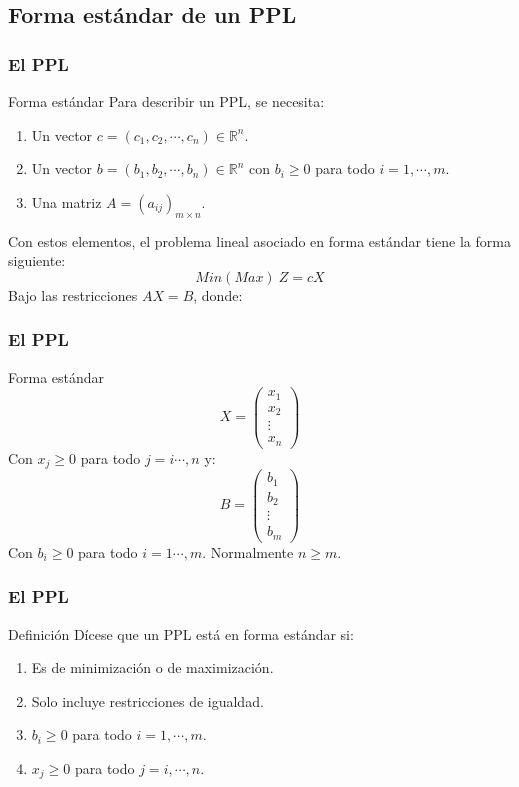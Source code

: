 \documentclass{beamer}
\begin{document}
\subsection{Forma est\'andar de un PPL}

\begin{frame}
\frametitle{El PPL}
\begin{block}{Forma est\'andar}
Para describir un PPL, se necesita:
\begin{enumerate}
\item Un vector $c=(c_1,c_2,\cdots, c_n)\in \mathbb R^n$.
\item Un vector $b=(b_1,b_2,\cdots, b_n)\in \mathbb R^n$ con $b_i\geq 0$ para todo $i=1,\cdots, m$.
\item Una matriz $A = (a_{ij})_{m\times n}$.
\end{enumerate}
Con estos elementos, el problema lineal asociado en forma est\'andar tiene la forma siguiente:
\[Min(Max)\ Z = cX\]
Bajo las restricciones $AX=B$, donde:
\end{block}
\end{frame}



\begin{frame}
\frametitle{El PPL}
\begin{block}{Forma est\'andar}
\[X=\left(\begin{array}{l}x_1\\ x_2\\ \vdots \\ x_n \end{array}\right)\]
Con $x_j\geq 0$ para todo $j=i\cdots, n$ y:
\[B=\left(\begin{array}{l}b_1\\ b_2\\ \vdots \\ b_m \end{array}\right)\]
Con $b_i\geq 0$ para todo $i=1\cdots, m$. Normalmente $n\geq m$.
\end{block}
\end{frame}



\begin{frame}
\frametitle{El PPL}
\begin{block}{Definici\'on}
D\'icese que un PPL est\'a en forma est\'andar si:
\begin{enumerate}
\item Es de minimizaci\'on o de maximizaci\'on.
\item Solo incluye restricciones de igualdad.
\item $b_i\geq 0$ para todo $i=1,\cdots, m$.
\item $x_j\geq 0$ para todo $j=i,\cdots, n$.
\end{enumerate}
\end{block}
\end{frame}
\end{document}
